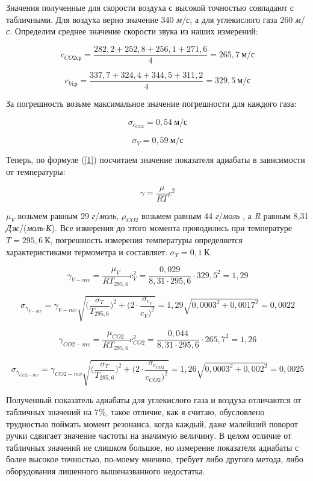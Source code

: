 \documentclass[12pt,a4paper]{article}
\begin{document}
Значения полученные для скорости воздуха с высокой точностью совпадают с табличными. Для воздуха верно значение 340 \textit{м}/\textit{с}, а для углекислого газа 260 \textit{м}/\textit{с}. Определим среднее значение скорости звука из наших измерений:

\[c_{CO2\textit{ср}} = \frac{282,2 + 252,8 + 256,1 + 271,6}{4} = 265,7 \: \textit{м}/ \textit{с}\]

\[c_{V\textit{ср}} = \frac{337,7+324,4+344,5+311,2}{4} = 329,5 \: \textit{м}/ \textit{с}\]

За погрешность возьме максимальное значение погрешности для каждого газа:

\[\sigma_{c_{CO2}} = 0,54 \: \textit{м}/ \textit{с}\]

\[\sigma_{V} = 0,59 \: \textit{м}/ \textit{с}\]

\vspace{0.5cm}

Теперь, по формуле (\ref{1}) посчитаем значение показателя адиабаты в зависимости от температуры:

\[\gamma = \frac{\mu}{RT}c^2\]

$\mu_V$ возьмем равным 29 \textit{г}/\textit{моль}, $\mu_{CO2}$ возьмем равным 44 \textit{г}/\textit{моль} , а \textit{R} равным 8,31 \textit{Дж}/(\textit{моль}$\cdot$\textit{К}). 
Все измерения до этого момента проводились при температуре $T = 295,6 \: \textit{К}$, погрешность измерения температуры определяется характеристиками термометра и составляет: $\sigma_T = 0,1 \: \textit{К}$.

\[\gamma_{V-mv} = \frac{\mu_{V}}{R T_{295,6}}c_{V}^2 = \frac{0,029}{8,31 \cdot 295,6} \cdot 329,5^2 = 1,29\] 

\[\sigma_{\gamma_{V-mv}} = \gamma_{V-mv} \sqrt{\Big( \frac{\sigma_T}{T_{295,6}}\Big)^2 + \Big(2 \cdot \frac{\sigma_{c_{V}}}{c_{V} \Big)^2}} = 1,29 \sqrt{0,0003^2 + 0,0017^2} =  0,0022\]


\[\gamma_{CO2-mv} = \frac{\mu_{CO2}}{R T_{295,6}}c_{CO2}^2 = \frac{0,044}{8,31 \cdot 295,6} \cdot 265,7^2 = 1,26\] 

\[\sigma_{\gamma_{CO2-mv}} = \gamma_{CO2-mv} \sqrt{\Big( \frac{\sigma_T}{T_{295,6}}\Big)^2 + \Big(2 \cdot \frac{\sigma_{c_{CO2}}}{c_{CO2} \Big)^2}} = 1,26 \sqrt{0,0003^2 + 0,002^2} =  0,0025\]

\vspace{0.5cm}

Полученный показатель адиабаты для углекислого газа и воздуха отличаются от табличных значений на $7\%$, такое отличие, как я считаю, обусловлено трудностью поймать момент резонанса, когда каждый, даже малейший поворот ручки сдвигает значение частоты на значимую величину. В целом отличие от табличных значений не слишком большое, но измерение показателя адиабаты с более высокое точностью, по-моему мнению, требует либо другого метода, либо оборудования лишенного вышеназванного недостатка.
\end{document}
